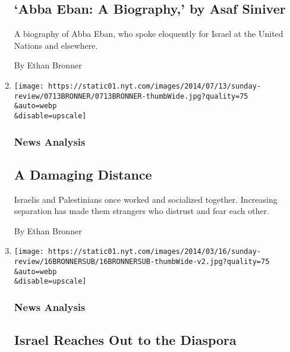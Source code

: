 \begin{enumerate}
  \hypertarget{abba-eban-a-biography-by-asaf-siniver}{%
  \subsection{`Abba Eban: A Biography,' by Asaf
  Siniver}\label{abba-eban-a-biography-by-asaf-siniver}}

  A biography of Abba Eban, who spoke eloquently for Israel at the
  United Nations and elsewhere.

  By Ethan Bronner
\item
  \href{/2014/07/13/sunday-review/for-israelis-and-palestinians-separation-is-dehumanizing.html}{}

  \texttt{[image: https://static01.nyt.com/images/2014/07/13/sunday-review/0713BRONNER/0713BRONNER-thumbWide.jpg?quality=75\\\&auto=webp\\\&disable=upscale]}

  \hypertarget{news-analysis}{%
  \subsubsection{News Analysis}\label{news-analysis}}

  \hypertarget{a-damaging-distance}{%
  \subsection{A Damaging Distance}\label{a-damaging-distance}}

  Israelis and Palestinians once worked and socialized together.
  Increasing separation has made them strangers who distrust and fear
  each other.

  By Ethan Bronner
\item
  \href{/2014/03/16/sunday-review/israel-reaches-out-to-the-diaspora.html}{}

  \texttt{[image: https://static01.nyt.com/images/2014/03/16/sunday-review/16BRONNERSUB/16BRONNERSUB-thumbWide-v2.jpg?quality=75\\\&auto=webp\\\&disable=upscale]}

  \hypertarget{news-analysis-1}{%
  \subsubsection{News Analysis}\label{news-analysis-1}}

  \hypertarget{israel-reaches-out-to-the-diaspora}{%
  \subsection{Israel Reaches Out to the
  Diaspora}\label{israel-reaches-out-to-the-diaspora}}


\end{enumerate}
